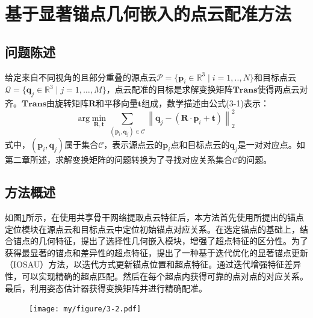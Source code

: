    \section{基于显著锚点几何嵌入的点云配准方法}
    \subsection{问题陈述}
    给定来自不同视角的且部分重叠的源点云$\mathcal{P}=\{{\mathbf{p}_i} \in \mathbb{R}^{3} \mid i=1,..,N\}$和目标点云$\mathcal{Q}=\{{\mathbf{q}_j} \in \mathbb{R}^{3} \mid j =1,\dots,M\}$，点云配准的目标是求解变换矩阵$\mathbf{Trans}$使得两点云对齐。$\mathbf{Trans}$由旋转矩阵$\mathbf{R}$和平移向量$\mathbf{t}$组成，数学描述由公式(3-1)表示：
    \begin{equation}
        \mathrm{arg}\underset{\mathbf{R}, \mathbf{t}}{\min} \sum_{(\mathbf{p}_i, \mathbf{q}_j) \in \mathcal{C}} 
        {\left\|{\mathbf{q}_j-(\mathbf{R} \cdot \mathbf{p}_i+\mathbf{t})}\right\|_{2}^{2}}
    \end{equation}
    式中，$(\mathbf{p}_i, \mathbf{q}_j)$属于集合$\mathcal{C}$，表示源点云的$\mathbf{p}_i$点和目标点云的$\mathbf{q}_j$是一对对应点。如第二章所述，求解变换矩阵的问题转换为了寻找对应关系集合$\mathcal{C}$的问题。

    \subsection{方法概述}
    如图\ref{fig:framework}所示，在使用共享骨干网络提取点云特征后，本方法首先使用所提出的锚点定位模块在源点云和目标点云中定位初始锚点对应关系。在选定锚点的基础上，结合锚点的几何特征，提出了选择性几何嵌入模块，增强了超点特征的区分性。为了获得最显著的锚点和差异性的超点特征，提出了一种基于迭代优化的显著锚点更新（IOSAU）方法，以迭代方式更新锚点位置和超点特征。通过迭代增强特征差异性，可以实现精确的超点匹配。然后在每个超点内获得可靠的点对点的对应关系。最后，利用姿态估计器获得变换矩阵并进行精确配准。

    \vspace{-0.1cm}
    \begin{figure}[h]
        \centering
        \texttt{[image: my/figure/3-2.pdf]}
        \label{fig:framework}
    \end{figure}
    \vspace{-0.35cm}

